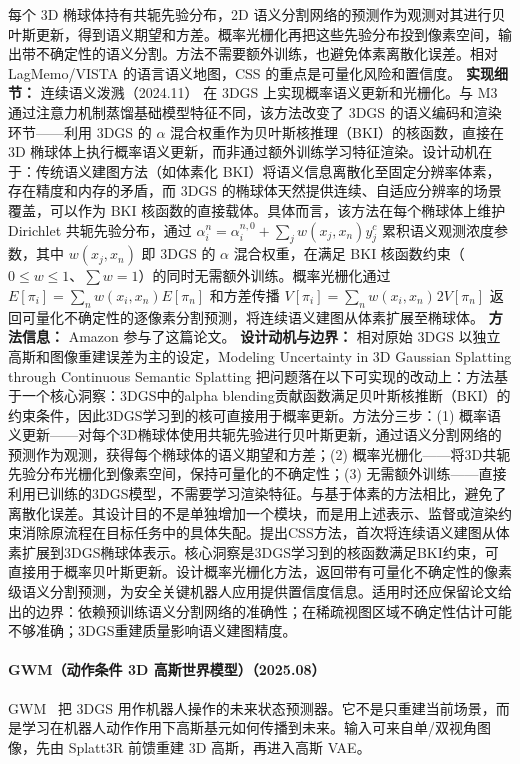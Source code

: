 每个 3D 椭球体持有共轭先验分布，2D 语义分割网络的预测作为观测对其进行贝叶斯更新，得到语义期望和方差。概率光栅化再把这些先验分布投到像素空间，输出带不确定性的语义分割。方法不需要额外训练，也避免体素离散化误差。相对 LagMemo/VISTA 的语言语义地图，CSS 的重点是可量化风险和置信度。
\textbf{实现细节：} 连续语义泼溅（2024.11） 在 3DGS 上实现概率语义更新和光栅化。与 M3 通过注意力机制蒸馏基础模型特征不同，该方法改变了 3DGS 的语义编码和渲染环节——利用 3DGS 的 $\alpha$ 混合权重作为贝叶斯核推理（BKI）的核函数，直接在 3D 椭球体上执行概率语义更新，而非通过额外训练学习特征渲染。设计动机在于：传统语义建图方法（如体素化 BKI）将语义信息离散化至固定分辨率体素，存在精度和内存的矛盾，而 3DGS 的椭球体天然提供连续、自适应分辨率的场景覆盖，可以作为 BKI 核函数的直接载体。具体而言，该方法在每个椭球体上维护 Dirichlet 共轭先验分布，通过 $\alpha_i^n = \alpha_i^{n,0} + \sum_j w(x_j, x_n) y_j^c$ 累积语义观测浓度参数，其中 $w(x_j, x_n)$ 即 3DGS 的 $\alpha$ 混合权重，在满足 BKI 核函数约束（$0 \leq w \leq 1$、$\sum w = 1$）的同时无需额外训练。概率光栅化通过 $E[\pi_i] = \sum_n w(x_i, x_n) E[\pi_n]$ 和方差传播 $V[\pi_i] = \sum_n w(x_i, x_n)^{}2 V[\pi_n]$ 返回可量化不确定性的逐像素分割预测，将连续语义建图从体素扩展至椭球体。
\textbf{方法信息：} Amazon 参与了这篇论文。
\textbf{设计动机与边界：} 相对原始 3DGS 以独立高斯和图像重建误差为主的设定，Modeling Uncertainty in 3D Gaussian Splatting through Continuous Semantic Splatting 把问题落在以下可实现的改动上：方法基于一个核心洞察：3DGS中的alpha blending贡献函数满足贝叶斯核推断（BKI）的约束条件，因此3DGS学习到的核可直接用于概率更新。方法分三步：(1) 概率语义更新——对每个3D椭球体使用共轭先验进行贝叶斯更新，通过语义分割网络的预测作为观测，获得每个椭球体的语义期望和方差；(2) 概率光栅化——将3D共轭先验分布光栅化到像素空间，保持可量化的不确定性；(3) 无需额外训练——直接利用已训练的3DGS模型，不需要学习渲染特征。与基于体素的方法相比，避免了离散化误差。其设计目的不是单独增加一个模块，而是用上述表示、监督或渲染约束消除原流程在目标任务中的具体失配。提出CSS方法，首次将连续语义建图从体素扩展到3DGS椭球体表示。核心洞察是3DGS学习到的核函数满足BKI约束，可直接用于概率贝叶斯更新。设计概率光栅化方法，返回带有可量化不确定性的像素级语义分割预测，为安全关键机器人应用提供置信度信息。适用时还应保留论文给出的边界：依赖预训练语义分割网络的准确性；在稀疏视图区域不确定性估计可能不够准确；3DGS重建质量影响语义建图精度。
\paragraph{GWM（动作条件 3D 高斯世界模型）（2025.08）}
GWM~\cite{2508_17600} 把 3DGS 用作机器人操作的未来状态预测器。它不是只重建当前场景，而是学习在机器人动作作用下高斯基元如何传播到未来。输入可来自单/双视角图像，先由 Splatt3R 前馈重建 3D 高斯，再进入高斯 VAE。

